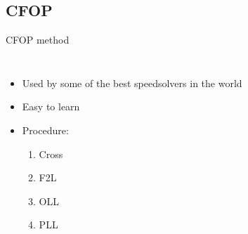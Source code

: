 \documentclass[10pt]{beamer}
\begin{document}
        \subsection{CFOP}
            \begin{frame}{CFOP method}
                \begin{columns}[c] 
                        \begin{itemize}
                            \item<2-> Used by some of the best speedsolvers in the world \pause{}
                            \item<3-> Easy to learn
                            \item<4-> Procedure:
                            \begin{enumerate}
                                \item<5-> Cross
                                \item<6-> F2L
                                \item<7-> OLL
                                \item<8-> PLL
                            \end{enumerate}
                        \end{itemize}
                        \begin{figure}

\end{figure}
\end{columns}
\end{frame}
\end{document}
